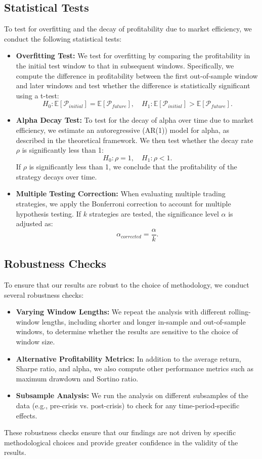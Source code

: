 \subsection{Statistical Tests}

To test for overfitting and the decay of profitability due to market efficiency, we conduct the following statistical tests:
\begin{itemize}
    \item \textbf{Overfitting Test:} We test for overfitting by comparing the profitability in the initial test window to that in subsequent windows. Specifically, we compute the difference in profitability between the first out-of-sample window and later windows and test whether the difference is statistically significant using a t-test:
    \[
    H_0: \mathbb{E}[\mathcal{P}_{initial}] = \mathbb{E}[\mathcal{P}_{future}], \quad H_1: \mathbb{E}[\mathcal{P}_{initial}] > \mathbb{E}[\mathcal{P}_{future}].
    \]
    \item \textbf{Alpha Decay Test:} To test for the decay of alpha over time due to market efficiency, we estimate an autoregressive (AR(1)) model for alpha, as described in the theoretical framework. We then test whether the decay rate $\rho$ is significantly less than 1:
    \[
    H_0: \rho = 1, \quad H_1: \rho < 1.
    \]
    If $\rho$ is significantly less than 1, we conclude that the profitability of the strategy decays over time.
    \item \textbf{Multiple Testing Correction:} When evaluating multiple trading strategies, we apply the Bonferroni correction to account for multiple hypothesis testing. If $k$ strategies are tested, the significance level $\alpha$ is adjusted as:
    \[
    \alpha_{corrected} = \frac{\alpha}{k}.
    \]
\end{itemize}

\subsection{Robustness Checks}

To ensure that our results are robust to the choice of methodology, we conduct several robustness checks:
\begin{itemize}
    \item \textbf{Varying Window Lengths:} We repeat the analysis with different rolling-window lengths, including shorter and longer in-sample and out-of-sample windows, to determine whether the results are sensitive to the choice of window size.
    \item \textbf{Alternative Profitability Metrics:} In addition to the average return, Sharpe ratio, and alpha, we also compute other performance metrics such as maximum drawdown and Sortino ratio.
    \item \textbf{Subsample Analysis:} We run the analysis on different subsamples of the data (e.g., pre-crisis vs. post-crisis) to check for any time-period-specific effects.
\end{itemize}

These robustness checks ensure that our findings are not driven by specific methodological choices and provide greater confidence in the validity of the results.
